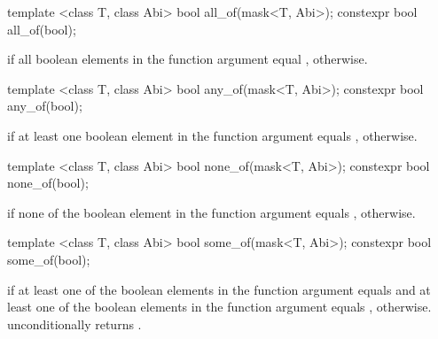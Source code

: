 \begin{itemdecl}
template <class T, class Abi> bool  all_of(mask<T, Abi>);
constexpr bool  all_of(bool);
\end{itemdecl}
\begin{itemdescr}
  \pnum\returns \true if all boolean elements in the function argument equal \true, \false otherwise.
\end{itemdescr}

\begin{itemdecl}
template <class T, class Abi> bool  any_of(mask<T, Abi>);
constexpr bool  any_of(bool);
\end{itemdecl}
\begin{itemdescr}
  \pnum\returns \true if at least one boolean element in the function argument equals \true, \false otherwise.
\end{itemdescr}

\begin{itemdecl}
template <class T, class Abi> bool none_of(mask<T, Abi>);
constexpr bool none_of(bool);
\end{itemdecl}
\begin{itemdescr}
  \pnum\returns \true if none of the boolean element in the function argument equals \true, \false otherwise.
\end{itemdescr}

\begin{itemdecl}
template <class T, class Abi> bool some_of(mask<T, Abi>);
constexpr bool some_of(bool);
\end{itemdecl}
\begin{itemdescr}
  \pnum\returns \true if at least one of the boolean elements in the function argument equals \true and at least one of the boolean elements in the function argument equals \false, \false otherwise.
  \pnum\realnote {} unconditionally returns \false.
\end{itemdescr}

